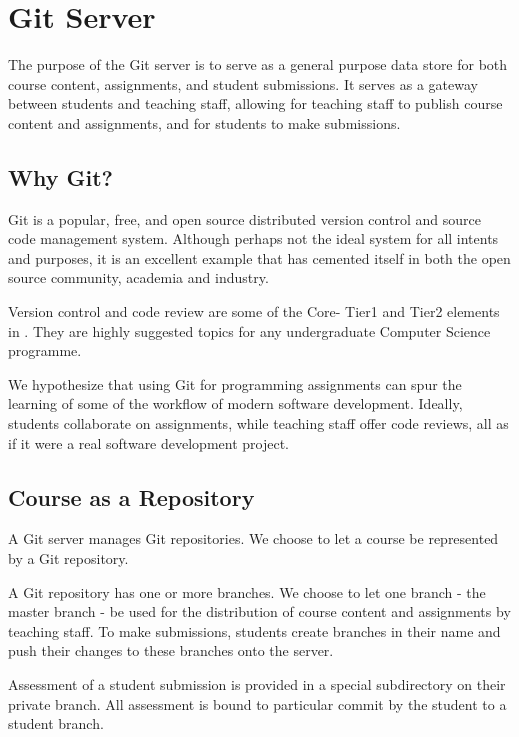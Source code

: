
\section{Git Server}

The purpose of the Git server is to serve as a general purpose data store for
both course content, assignments, and student submissions. It serves as a
gateway between students and teaching staff, allowing for teaching staff to
publish course content and assignments, and for students to make submissions.

\subsection{Why Git?}

Git is a popular\cite{ohloh-2014}, free, and open source distributed version
control and source code management system\cite{git-2014}. Although perhaps not
the ideal system for all intents and purposes, it is an excellent example that
has cemented itself in both the open source community, academia and
industry\cite{gitprojects-2014}.

Version control and code review are some of the Core- Tier1 and Tier2 elements
in \cite{cs-curricula-2013}. They are highly suggested topics for any
undergraduate Computer Science programme.

We hypothesize that using Git for programming assignments can spur the learning
of some of the workflow of modern software development. Ideally, students
collaborate on assignments, while teaching staff offer code reviews, all as if
it were a real software development project.


\subsection{Course as a Repository}

A Git server manages Git repositories. We choose to let a course be represented
by a Git repository.

A Git repository has one or more branches. We choose to let one branch - the
master branch - be used for the distribution of course content and assignments
by teaching staff. To make submissions, students create branches in their name
and push their changes to these branches onto the server.

Assessment of a student submission is provided in a special subdirectory on
their private branch. All assessment is bound to particular commit by the
student to a student branch.


